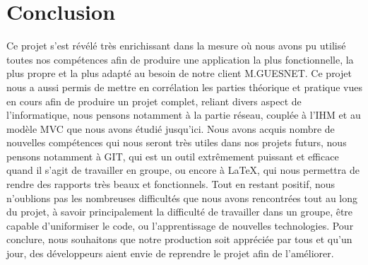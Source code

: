 \section*{Conclusion}

	Ce projet s'est révélé très enrichissant dans la mesure où nous avons pu utilisé toutes nos compétences afin de produire une application la plus fonctionnelle, la plus propre et la plus adapté au besoin de notre client M.GUESNET.\newline
	Ce projet nous a aussi permis de mettre en corrélation les parties théorique et pratique vues en cours afin de produire un projet complet, reliant divers aspect de l'informatique, nous pensons notamment à la partie réseau, couplée à l'IHM et au modèle MVC que nous avons étudié jusqu'ici.
	Nous avons acquis nombre de nouvelles compétences qui nous seront très utiles dans nos projets futurs, nous pensons notamment à GIT, qui est un outil extrêmement puissant et efficace quand il s'agit de travailler en groupe, ou encore à \LaTeX{}, qui nous permettra de rendre des rapports très beaux et fonctionnels.\newline
	Tout en restant positif, nous n'oublions pas les nombreuses difficultés que nous avons rencontrées tout au long du projet, à savoir principalement la difficulté de travailler dans un groupe, être capable d'uniformiser le code, ou l'apprentissage de nouvelles technologies.\newline
	Pour conclure, nous souhaitons que notre production soit appréciée par tous et qu'un jour, des développeurs aient envie de reprendre le projet afin de l'améliorer.

